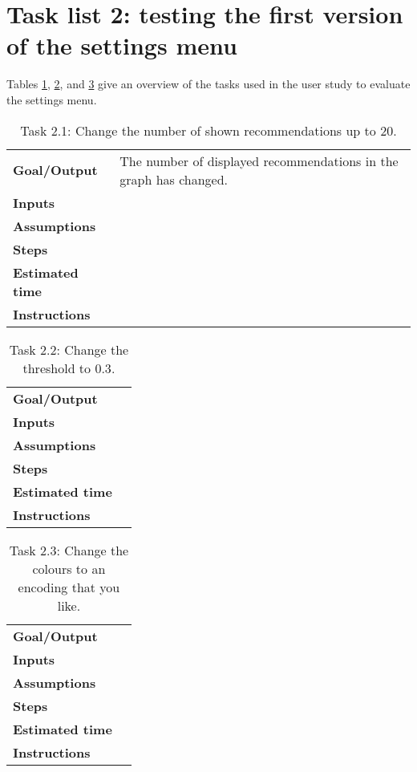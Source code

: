 \section{Task list 2: testing the first version of the settings menu}\label{appendix:tasklists:prototype2}

Tables \ref{table:task:t4}, \ref{table:task:t5}, and \ref{table:task:t6} give an overview of the tasks used in the user study to evaluate the settings menu.

\begin{table}
	\caption{Task 2.1: Change the number of shown recommendations up to $20$.}
	\begin{tabular}{ p{80px} | p{350px} }
		\hline
		\textbf{Goal/Output}			& The number of displayed recommendations in the graph has changed. \\
		\textbf{Inputs}						& \\
		\textbf{Assumptions}			& \\
		\textbf{Steps}						& \\
		\textbf{Estimated time} 	& \\
		\textbf{Instructions}			& \\
		\hline
	\end{tabular}
	\label{table:task:t4}
\end{table}


\begin{table}
	\caption{Task 2.2: Change the threshold to $0.3$.}
	\begin{tabular}{ p{80px} | p{350px} }
		\hline
		\textbf{Goal/Output}			& \\
		\textbf{Inputs}						& \\
		\textbf{Assumptions}			& \\
		\textbf{Steps}						& \\
		\textbf{Estimated time} 	& \\
		\textbf{Instructions}			& \\
		\hline
	\end{tabular}
	\label{table:task:t5}
\end{table}



\begin{table}
	\caption{Task 2.3: Change the colours to an encoding that you like.}
	\begin{tabular}{ p{80px} | p{350px} }
		\hline
		\textbf{Goal/Output}			& \\
		\textbf{Inputs}						& \\
		\textbf{Assumptions}			& \\
		\textbf{Steps}						& \\
		\textbf{Estimated time} 	& \\
		\textbf{Instructions}			& \\
		\hline
	\end{tabular}
	\label{table:task:t6}
\end{table}








